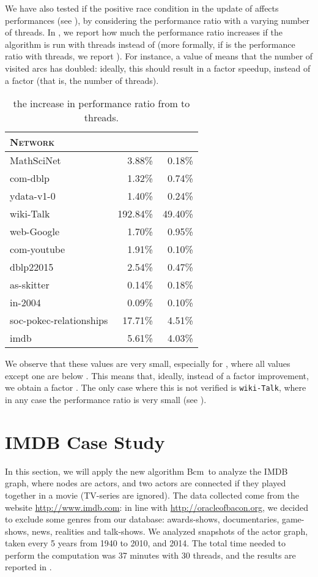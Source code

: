 \documentclass{acm_proc_article-sp}
\newcommand{\newalg}{{\sc Bcm}}
\begin{document}
We have also tested if the positive race condition in the update of  affects performances (see ), by considering the performance ratio with a varying number of threads. In , we report how much the performance ratio increases if the algorithm is run with  threads instead of  (more formally, if  is the performance ratio with  threads, we report ). For instance, a value of  means that the number of visited arcs has doubled: ideally, this should result in a factor  speedup, instead of a factor  (that is, the number of threads).
\begin{table}[t]
\caption{the increase in performance ratio from  to  threads.}
\label{tab:posrace}
\centering
\begin{tabular}{|l|r|r|}
\hline
\textsc{Network} &  &  \\
\hline
 MathSciNet                 &  3.88\%  &  0.18\%\\ 
 com-dblp           &  1.32\%  &  0.74\%\\ 
 ydata-v1-0                 &  1.40\%  &  0.24\%\\ 
 wiki-Talk                  &  192.84\%  &  49.40\%\\ 
 web-Google                 &  1.70\%  &  0.95\%\\ 
 com-youtube        &  1.91\%  &  0.10\%\\ 
 dblp22015     &  2.54\%  &  0.47\%\\ 
 as-skitter                 &  0.14\%  &  0.18\%\\ 
 in-2004                    &  0.09\%  &  0.10\% \\ 
 soc-pokec-relationships    &  17.71\%  & 4.51\% \\ 
 imdb                       &  5.61\%  & 4.03\% \\
 \hline
\end{tabular}
\end{table}
We observe that these values are very small, especially for , where all values except one are below . This means that, ideally, instead of a factor  improvement, we obtain a factor . The only case where this is not verified is \texttt{wiki-Talk}, where in any case the performance ratio is very small (see ).



\section{IMDB Case Study} \label{sec:imdb}
In this section, we will apply the new algorithm \newalg\ to analyze the IMDB graph, where nodes are actors, and two actors are connected if they played together in a movie (TV-series are ignored). The data collected come from the website \url{http://www.imdb.com}: in line with \url{http://oracleofbacon.org}, we decided to exclude some genres from our database: awards-shows, documentaries, game-shows, news, realities and talk-shows. We analyzed snapshots of the actor graph, taken every 5 years from 1940 to 2010, and 2014. The total time needed to perform the computation was 37 minutes with 30 threads, and the results are reported in .
\end{document}
